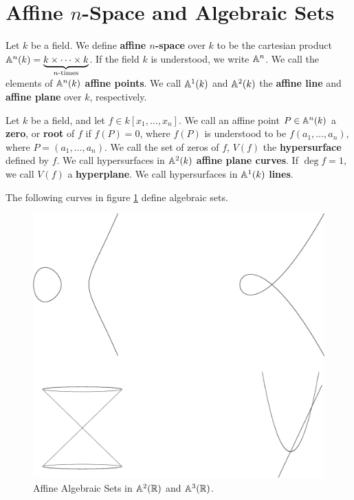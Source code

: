 \section{Affine $n$-Space and Algebraic Sets}

\begin{definition}
    Let $k$ be a field. We define  \textbf{affine $n$-space} over $k$ to be the
    cartesian product  $\mathbb{A}^n(k) = \underbrace{k \times \dots \times
    k}_{n\text{-times}}$. If the field $k$ is understood, we write  $\mathbb{A}^n$. We
    call the elements of  $\mathbb{A}^n(k)$ \textbf{affine points}. We call $\mathbb{A}^1(k)$ and
    $\mathbb{A}^2(k)$ the \textbf{affine line} and \textbf{affine plane} over $k$,
    respectively.
\end{definition}

\begin{definition}
    Let $k$ be a field, and let  $f \in k[x_1, \dots, x_n]$. We call an affine
    point $P \in \mathbb{A}^n(k)$ a \textbf{zero}, or \textbf{root} of $f$ if $f(P)=0$,
    where $f(P)$ is understood to be $f(a_1, \dots, a_n)$, where $P=(a_1, \dots,
    a_n)$. We call the set of zeros of $f$, $V(f)$ the \textbf{hypersurface}
    defined by $f$. We call hypersurfaces in  $\mathbb{A}^2(k)$ \textbf{affine plane
    curves}. If $\deg{f}=1$, we call $V(f)$ a \textbf{hyperplane}. We call
    hypersurfaces in $\mathbb{A}^1(k)$ \textbf{lines}.
\end{definition}

\begin{example}\label{example_1.4}
    The following curves in figure \ref{figure_1.1} define algebraic sets.
    \begin{figure}[h]
        \centering
        \includegraphics[scale=0.5]{Figures/Chapter1/hyperplanes.eps}
        \caption{Affine Algebraic Sets in $\mathbb{A}^2(\mathbb{R})$ and $\mathbb{A}^3(\mathbb{R})$.}
        \label{figure_1.1}
    \end{figure}
\end{example}

